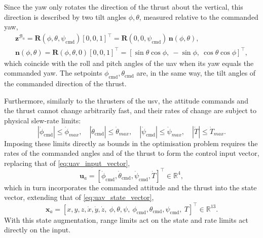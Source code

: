 Since the yaw only rotates the direction of the thrust about the vertical, this direction is described by two tilt angles $\phi, \theta$, measured relative to the commanded yaw,
\begin{equation}
    \begin{gathered}
        \mathbf{z}^{\mathcal{B}_a} = \mathbf{R}(\phi,\theta,\psi_{\mathrm{cmd}})[0,0,1]^\top = \mathbf{R}(0,0,\psi_{\mathrm{cmd}})\,\mathbf{n}(\phi,\theta), \\
        \mathbf{n}(\phi,\theta) = \mathbf{R}(\phi,\theta,0)[0,0,1]^\top = [\sin\theta\cos\phi,\ -\sin\phi,\ \cos\theta\cos\phi]^\top,
    \end{gathered}
    \label{eq:uav_mpc_tilt}
\end{equation}
which coincide with the roll and pitch angles of the \gls{uav} when its yaw equals the commanded yaw. The setpoints $\phi_{\mathrm{cmd}}, \theta_{\mathrm{cmd}}$ are, in the same way, the tilt angles of the commanded direction of the thrust.

Furthermore, similarly to the thrusters of the \gls{usv}, the attitude commands and the thrust cannot change arbitrarily fast, and their rates of change are subject to physical slew-rate limits:
\begin{equation}
    |\dot\phi_{\mathrm{cmd}}| \le \dot\phi_{max}, \quad |\dot\theta_{\mathrm{cmd}}| \le \dot\theta_{max}, \quad |\dot\psi_{\mathrm{cmd}}| \le \dot\psi_{max}, \quad |\dot T| \le \dot T_{max}.
    \label{eq:uav_mpc_rate_bounds}
\end{equation}
Imposing these limits directly as bounds in the optimisation problem requires the rates of the commanded angles and of the thrust to form the control input vector, replacing that of \eqref{eq:uav_input_vector},
\begin{equation}
    \mathbf{u}_a = [\dot\phi_{\mathrm{cmd}},\dot\theta_{\mathrm{cmd}},\dot\psi_{\mathrm{cmd}},\dot T]^\top \in \mathbb{R}^4,
    \label{eq:uav_mpc_input_augmented}
\end{equation}
which in turn incorporates the commanded attitude and the thrust into the state vector, extending that of \eqref{eq:uav_state_vector},
\begin{equation}
    \mathbf{x}_a = [x,y,z,\dot x,\dot y,\dot z,\ \phi,\theta,\psi,\ \phi_{\mathrm{cmd}},\theta_{\mathrm{cmd}},\psi_{\mathrm{cmd}},\ T]^\top \in \mathbb{R}^{13}.
    \label{eq:uav_mpc_state_augmented}
\end{equation}
With this state augmentation, range limits act on the state and rate limits act directly on the input.

